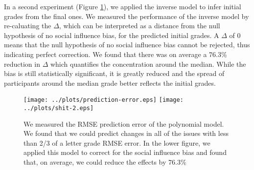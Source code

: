 In a second experiment (Figure \ref{poly-1}), we applied the inverse model to infer initial grades from the final ones.
We measured the performance of the inverse model by re-caluating the $\Delta$, which can be interpreted as a distance from the null hypothesis of no social influence bias, for the predicted initial grades.
A $\Delta$ of 0 means that the null hypothesis of no social influence bias cannot be rejected, thus indicating perfect correction.
We found that there was on average a 76.3\% reduction in $\Delta$ which quantifies the concentration around the median. 
While the bias is still statistically significant, it is greatly reduced and the spread of participants around the median grade better reflects the initial grades.

\begin{figure}[h]
\hspace*{-2em}
    \texttt{[image: ../plots/prediction-error.eps]}
    \hspace*{-2em}
    \texttt{[image: ../plots/shit-2.eps]}
      \caption{We measured the RMSE prediction error of the polynomial model. We found that we could predict changes in all of the issues with less than 2/3 of a letter grade RMSE error. In the lower figure, we applied this model to correct for the social influence bias and found that, on average, we could reduce the effects by 76.3\%}
      \label{poly-1}
\end{figure}




